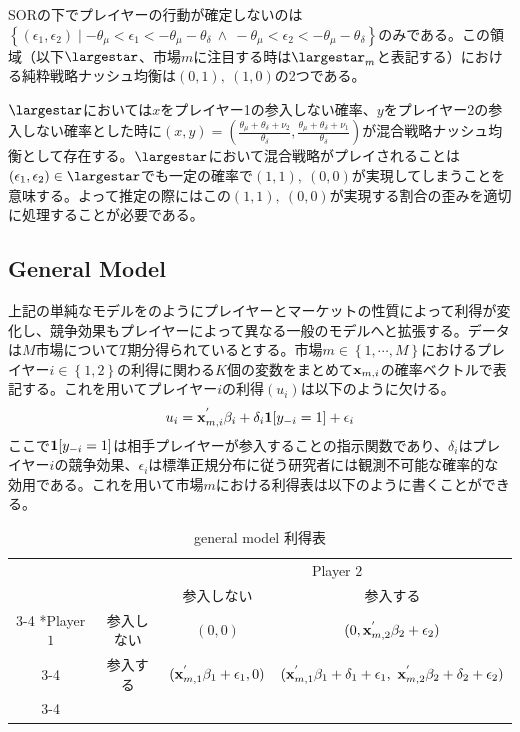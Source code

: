 \documentclass{jsarticle}
\begin{document}
SORの下でプレイヤーの行動が確定しないのは$\left\{ (\epsilon_1, \epsilon_2) \mid -\theta_{\mu} < \epsilon_1 < -\theta_{\mu} - \theta_{\delta}\ \wedge\  -\theta_{\mu} < \epsilon_2 < -\theta_{\mu} - \theta_{\delta} \right\}$のみである。この領域（以下$\largestar$、市場$m$に注目する時は$\largestar_m$と表記する）における純粋戦略ナッシュ均衡は$(0,1),\ (1,0)$の2つである。

$\largestar$においては$x$をプレイヤー1の参入しない確率、$y$をプレイヤー2の参入しない確率とした時に$(x, y) = \left( \frac{\theta_{\mu} + \theta_{\delta} + \nu_2}{\theta_{\delta}} ,  \frac{\theta_{\mu} + \theta_{\delta} + \nu_1}{\theta_{\delta}} \right)$が混合戦略ナッシュ均衡として存在する。$\largestar$において混合戦略がプレイされることは$(\epsilon_1, \epsilon_2) \in \largestar$でも一定の確率で$(1,1),\ (0,0)$が実現してしまうことを意味する。よって推定の際にはこの$(1,1),\ (0,0)$が実現する割合の歪みを適切に処理することが必要である。

\subsection{General Model}
上記の単純なモデルを\cite{Tamer2003a}のようにプレイヤーとマーケットの性質によって利得が変化し、競争効果もプレイヤーによって異なる一般のモデルへと拡張する。データは$M$市場について$T$期分得られているとする。市場$m \in \left\{ 1, \cdots, M\right\}$におけるプレイヤー$i \in \left\{ 1,2\right\}$の利得に関わる$K$個の変数をまとめて${\bf x}_{m, i}$の確率ベクトルで表記する。これを用いてプレイヤー$i$の利得$(u_i)$は以下のように欠ける。
\begin{align*}
	u_i = {\bf x}_{m, i}^{'} \beta_i + \delta_i {\bf 1}[y_{-i} = 1]+ \epsilon_i
\end{align*}
ここで${\bf 1}[y_{-i} = 1]$は相手プレイヤーが参入することの指示関数であり、$\delta_i$はプレイヤー$i$の競争効果、$\epsilon_i$は標準正規分布に従う研究者には観測不可能な確率的な効用である。これを用いて市場$m$における利得表は以下のように書くことができる。
\begin{table}[h]
    \caption{general model 利得表}
    \centering
    \setlength{\extrarowheight}{2pt}
    \begin{tabular}{cc|c|c|}
      & \multicolumn{1}{c}{} & \multicolumn{2}{c}{Player $2$}\\
      & \multicolumn{1}{c}{} & \multicolumn{1}{c}{参入しない}  & \multicolumn{1}{c}{参入する} \\\cline{3-4}
      \multirow{2}*{Player $1$}  & 参入しない & $(0,0)$ & $(0,{\bf x}_{m, 2}^{'} \beta_2+\epsilon_2)$ \\\cline{3-4}
      & 参入する & $({\bf x}_{m, 1}^{'} \beta_1+\epsilon_1,0)$ & $({\bf x}_{m, 1}^{'} \beta_1+\delta_1+\epsilon_1,\ {\bf x}_{m, 2}^{'} \beta_2+\delta_2+\epsilon_2)$ \\\cline{3-4}
    \end{tabular}
\end{table}
\end{document}

